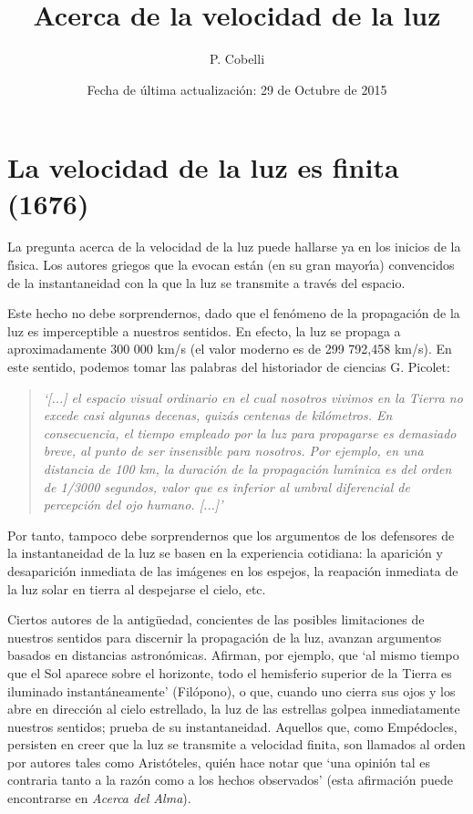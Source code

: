 \documentclass{article}
\begin{document}
\title{Acerca de la velocidad de la luz}
\author{P. Cobelli}
\date{Fecha de \'ultima actualizaci\'on: 29 de Octubre de 2015}
\maketitle

\section{La velocidad de la luz es finita (1676)}

La pregunta acerca de la velocidad de la luz puede hallarse ya en los inicios
de la f\'\i sica. Los autores griegos que la evocan est\'an (en su gran 
mayor\'\i a) convencidos de la instantaneidad con la que la luz se 
transmite a trav\'es del espacio. 

Este hecho no debe sorprendernos, dado que el fen\'omeno de la propagaci\'on
de la luz es imperceptible a nuestros sentidos. En efecto, la luz se propaga
a aproximadamente 300 000 km/s (el valor moderno es de 299 792,458 km/s).
En este sentido, podemos tomar las palabras del historiador de ciencias G.
Picolet:

\begin{quote}
    {\it 
        `[...] el espacio visual ordinario en el cual nosotros vivimos en
        la Tierra no excede casi algunas decenas, quiz\'as centenas de 
        kil\'ometros. En consecuencia, el tiempo empleado por la luz para
        propagarse es demasiado breve, al punto de ser insensible para 
        nosotros. Por ejemplo, en una distancia de 100 km, la duraci\'on
        de la propagaci\'on lum\'\i nica es del orden de 1/3000 segundos,
        valor que es inferior al umbral diferencial de percepci\'on del
        ojo humano. [...]'
    }
\end{quote}

Por tanto, tampoco debe sorprendernos que los argumentos de los defensores
de la instantaneidad de la luz se basen en la experiencia cotidiana: la 
aparici\'on y desaparici\'on inmediata de las im\'agenes en los espejos, 
la reapaci\'on inmediata de la luz solar en tierra al despejarse el cielo,
etc. 

Ciertos autores de la antig\"uedad, concientes de las posibles limitaciones
de nuestros sentidos para discernir la propagaci\'on de la luz, avanzan 
argumentos basados en distancias astron\'omicas. Afirman, por ejemplo, 
que `al mismo tiempo que el Sol aparece sobre el horizonte, todo el 
hemisferio superior de la Tierra es iluminado instant\'aneamente' (Fil\'opono),
o que, cuando uno cierra sus ojos y los abre en direcci\'on al cielo 
estrellado, la luz de las estrellas golpea inmediatamente nuestros 
sentidos; prueba de su instantaneidad. Aquellos que, como Emp\'edocles, 
persisten en creer que la luz se transmite a velocidad finita, son llamados
al orden por autores tales como Arist\'oteles, qui\'en hace notar que 
`una opini\'on tal es contraria tanto a la raz\'on como a los hechos 
observados' (esta afirmaci\'on puede encontrarse en {\it Acerca del Alma}).
\end{document}
